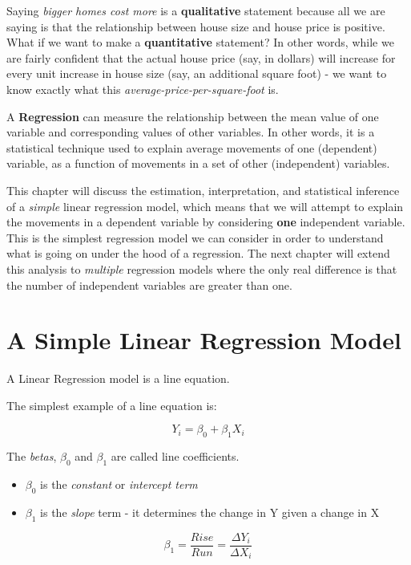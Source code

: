 \documentclass[
]{book}
\begin{document}
Saying \emph{bigger homes cost more} is a \textbf{qualitative} statement because all we are saying is that the relationship between house size and house price is positive. What if we want to make a \textbf{quantitative} statement? In other words, while we are fairly confident that the actual house price (say, in dollars) will increase for every unit increase in house size (say, an additional square foot) - we want to know exactly what this \emph{average-price-per-square-foot} is.

A \textbf{Regression} can measure the relationship between the mean value of one variable and corresponding values of other variables. In other words, it is a statistical technique used to explain average movements of one (dependent) variable, as a function of movements in a set of other (independent) variables.

This chapter will discuss the estimation, interpretation, and statistical inference of a \emph{simple} linear regression model, which means that we will attempt to explain the movements in a dependent variable by considering \textbf{one} independent variable. This is the simplest regression model we can consider in order to understand what is going on under the hood of a regression. The next chapter will extend this analysis to \emph{multiple} regression models where the only real difference is that the number of independent variables are greater than one.

\hypertarget{a-simple-linear-regression-model}{%
\section{A Simple Linear Regression Model}\label{a-simple-linear-regression-model}}

A Linear Regression model is a line equation.

The simplest example of a line equation is:

\[Y_i=\beta_0+\beta_1X_i\]

The \emph{betas}, \(\beta_0\) and \(\beta_1\) are called line coefficients.

\begin{itemize}
\item
  \(\beta_0\) is the \emph{constant} or \emph{intercept term}
\item
  \(\beta_1\) is the \emph{slope} term - it determines the change in Y given a change in X
\end{itemize}

\[\beta_1=\frac{Rise}{Run}=\frac{\Delta Y_i}{\Delta X_i}\]
\end{document}
